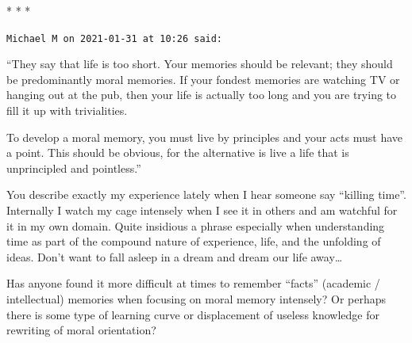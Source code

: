 
\begin{center}* * *\end{center}

\begin{footnotesize}\begin{sffamily}



\texttt{Michael M on 2021-01-31 at 10:26 said: }

“They say that life is too short. Your memories should be relevant; they should be predominantly moral memories. If your fondest memories are watching TV or hanging out at the pub, then your life is actually too long and you are trying to fill it up with trivialities.

To develop a moral memory, you must live by principles and your acts must have a point. This should be obvious, for the alternative is live a life that is unprincipled and pointless.”

You describe exactly my experience lately when I hear someone say “killing time”. Internally I watch my cage intensely when I see it in others and am watchful for it in my own domain. Quite insidious a phrase especially when understanding time as part of the compound nature of experience, life, and the unfolding of ideas. Don't want to fall asleep in a dream and dream our life away…

Has anyone found it more difficult at times to remember “facts” (academic / intellectual) memories when focusing on moral memory intensely? Or perhaps there is some type of learning curve or displacement of useless knowledge for rewriting of moral orientation?


\end{sffamily}\end{footnotesize}
